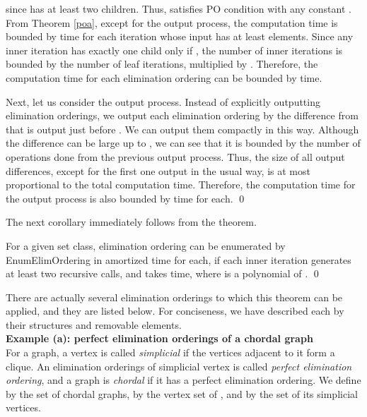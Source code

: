 \documentclass{llncs}
\begin{document}
\vspace{-2mm}

\vspace{-3mm}

\noindent
since  has at least two children.
Thus,  satisfies PO condition with any constant .
From Theorem \ref{poa}, except for the output process, the computation
 time is bounded by  time for each iteration whose input
  has at least  elements.
Since any inner iteration  has exactly one child only if ,
 the number of inner iterations is bounded by the number of leaf
 iterations, multiplied by .
Therefore, the computation time for each elimination ordering can be 
 bounded by  time.

Next, let us consider the output process.
Instead of explicitly outputting elimination orderings, we output
 each elimination ordering  by the difference from  that is
  output just before .
We can output them compactly in this way.
Although the difference can be large up to , we can see
 that it is bounded by the number of operations done from the previous 
 output process.
Thus, the size of all output differences, except for the first one output 
 in the usual way, is at most proportional to the total computation time.
Therefore, the computation time for the output process
 is also bounded by  time for each.
\qed

The next corollary immediately follows from the theorem.

\begin{corollary}
For a given set class, elimination ordering can be enumerated 
 by EnumElimOrdering in  amortized time for each, if each
 inner iteration generates at least two recursive calls, and 
 takes  time, where  is a polynomial of . \qed
\end{corollary}

There are actually several elimination orderings to which this 
 theorem can be applied, and they are listed below.
For conciseness, we have described each by their structures and
 removable elements.\\

\vspace{-1mm}
{\bf Example (a): perfect elimination orderings of a chordal
 graph\cite{enumPEO}}\\
For a graph, a vertex is called {\em simplicial} if the vertices adjacent
 to it form a clique.
An elimination orderings of simplicial vertex is called {\em perfect
elimination ordering}\cite{elimord}, and a graph is {\em chordal}
 if it has a perfect elimination ordering.
We define  by the set of chordal graphs,  by the vertex
 set of , and  by the set of its simplicial vertices.
\end{document}

